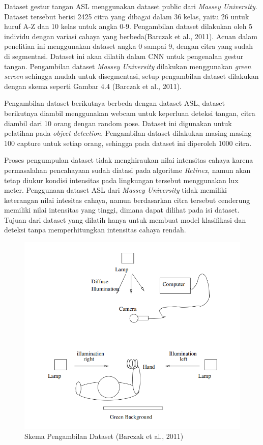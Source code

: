 Dataset gestur tangan ASL menggunakan dataset public dari \emph{Massey University}. Dataset tersebut berisi 2425 citra yang dibagai dalam 36 kelas, yaitu 26 untuk huruf A-Z dan 10 kelas untuk angka 0-9. Pengambilan dataset dilakukan oleh 5 individu dengan variasi cahaya yang berbeda(Barczak et al., 2011).
Acuan dalam penelitian ini menggunakan dataset angka 0 sampai 9, dengan citra yang sudah di segmentasi.
Dataset ini akan dilatih dalam CNN untuk pengenalan gestur tangan.
Pengambilan dataset \emph{Massey University} dilakukan menggunakan \emph{green screen} sehingga mudah untuk disegmentasi, setup pengambilan dataset dilakukan dengan skema seperti Gambar 4.4 (Barczak et al., 2011).

Pengambilan dataset berikutnya berbeda dengan dataset ASL, dataset berikutnya diambil menggunakan webcam untuk keperluan deteksi tangan, citra diambil dari 10 orang dengan random pose. Dataset ini digunakan untuk pelatihan pada \emph{object detection}. 
Pengambilan dataset dilakukan masing masing 100 capture untuk setiap orang, sehingga pada dataset ini diperoleh 1000 citra. 

Proses pengumpulan dataset tidak menghiraukan nilai intensitas cahaya karena permasalahan pencahayaan sudah diatasi pada algoritme \emph{Retinex}, namun akan tetap diukur kondisi intensitas pada lingkungan tersebut menggunakan lux meter. Penggunaan dataset ASL dari \emph{Massey University} tidak memiliki keterangan nilai intesitas cahaya, namun berdasarkan citra tersebut cenderung memiliki nilai intensitas yang tinggi, dimana dapat dilihat pada isi dataset. Tujuan dari dataset yang dilatih hanya untuk membuat model klasifikasi dan deteksi tanpa memperhitungkan intensitas cahaya rendah.
\begin{figure}[H]
	\centering
	\includegraphics[width=0.8\linewidth]{setup}
	\caption{Skema Pengambilan Dataset (Barczak et al., 2011)}
	\label{fig:setup}
\end{figure}
